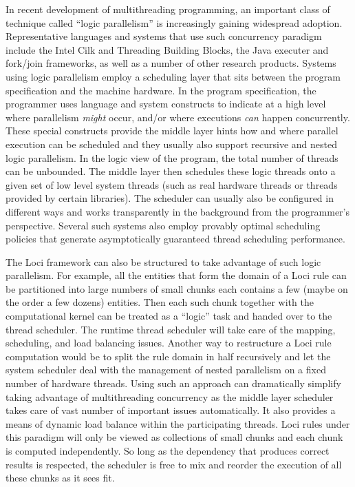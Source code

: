 \documentclass{article}
\begin{document}
In recent development of multithreading programming, an important class
of technique called ``logic parallelism'' is increasingly gaining
widespread adoption.  Representative languages and systems that use such
concurrency paradigm include the Intel Cilk and Threading Building
Blocks, the Java executer and fork/join frameworks, as well as a number
of other research products.  Systems using logic parallelism employ a
scheduling layer that sits between the program specification and the
machine hardware.  In the program specification, the programmer uses
language and system constructs to indicate at a high level where
parallelism {\em might} occur, and/or where executions {\em can} happen
concurrently.  These special constructs provide the middle layer hints
how and where parallel execution can be scheduled and they usually also
support recursive and nested logic parallelism.  In the logic view of
the program, the total number of threads can be unbounded.  The middle
layer then schedules these logic threads onto a given set of low level
system threads (such as real hardware threads or threads provided by
certain libraries).  The scheduler can usually also be configured in
different ways and works transparently in the background from the
programmer's perspective.  Several such systems also employ provably
optimal scheduling policies that generate asymptotically guaranteed
thread scheduling performance.

The Loci framework can also be structured to take advantage of such
logic parallelism.  For example, all the entities that form the
domain of a Loci rule can be partitioned into large numbers of small
chunks each contains a few (maybe on the order a few dozens) entities.
Then each such chunk together with the computational kernel can be
treated as a ``logic'' task and handed over to the thread scheduler.
The runtime thread scheduler will take care of the mapping, scheduling,
and load balancing issues.  Another way to restructure a Loci rule
computation would be to split the rule domain in half recursively and
let the system scheduler deal with the management of nested parallelism
on a fixed number of hardware threads.  Using such an approach can
dramatically simplify taking advantage of multithreading concurrency as
the middle layer scheduler takes care of vast number of important issues
automatically.  It also provides a means of dynamic load balance within
the participating threads.  Loci rules under this paradigm will only be
viewed as collections of small chunks and each chunk is computed
independently.  So long as the dependency that produces correct results
is respected, the scheduler is free to mix and reorder the execution of
all these chunks as it sees fit.
\end{document}
